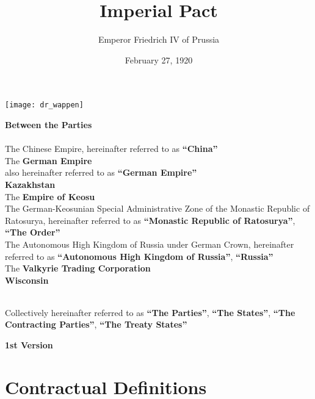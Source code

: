 \documentclass{article}
\title{Imperial Pact}
\author{Emperor Friedrich IV of Prussia}
\date{February 27, 1920}
\begin{document}
\maketitle
\begin{center}
    \texttt{[image: dr\_wappen]}
\end{center}
\begin{center}
    \textbf{Between the Parties\\}\textbf{\\}
    The Chinese Empire, hereinafter referred to as \textbf{``China''\\}
    The \textbf{German Empire\\} also hereinafter referred to as \textbf{``German Empire''\\}
    \textbf{Kazakhstan\\}
    The \textbf{Empire of Keosu\\}
    The German-Keosunian Special Administrative Zone of the Monastic Republic of Ratosurya, hereinafter referred to as \textbf{``Monastic Republic of Ratosurya''}, \textbf{``The Order''\\}
    The Autonomous High Kingdom of Russia under German Crown, hereinafter referred to as \textbf{``Autonomous High Kingdom of Russia''}, \textbf{``Russia''\\}
    The \textbf{Valkyrie Trading Corporation\\}
    \textbf{Wisconsin\\}\textbf{\\}

    Collectively hereinafter referred to as \textbf{``The Parties''}, \textbf{``The States''}, \textbf{``The Contracting Parties''}, \textbf{``The Treaty States''}
\end{center}
\newpage
{}
\vspace*{\fill}
\begin{Center}
\textbf{1st Version}
\vspace*{\fill}
\end{Center}
\newpage
\tableofcontents
\newpage
\section{Contractual Definitions}
\end{document}
